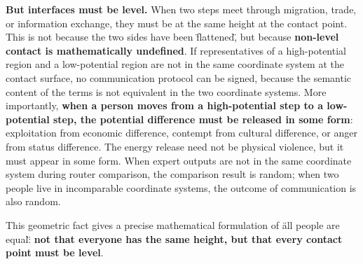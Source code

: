 \documentclass[12pt,a4paper]{article}
\theoremstyle{remark}
\begin{document}
\textbf{But interfaces must be level.} When two steps meet through migration, trade, or information exchange, they must be at the same height at the contact point. This is not because the two sides have been \"flattened\", but because \textbf{non-level contact is mathematically undefined}. If representatives of a high-potential region and a low-potential region are not in the same coordinate system at the contact surface, no communication protocol can be signed, because the semantic content of the terms is not equivalent in the two coordinate systems. More importantly, \textbf{when a person moves from a high-potential step to a low-potential step, the potential difference must be released in some form}: exploitation from economic difference, contempt from cultural difference, or anger from status difference. The energy release need not be physical violence, but it must appear in some form. When expert outputs are not in the same coordinate system during router comparison, the comparison result is random; when two people live in incomparable coordinate systems, the outcome of communication is also random.

\begin{center}
\end{center}

This geometric fact gives a precise mathematical formulation of \"all people are equal\": \textbf{not that everyone has the same height, but that every contact point must be level}.
\end{document}
